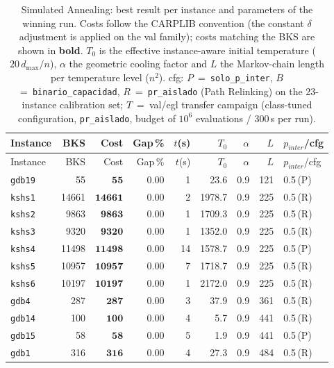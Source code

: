 \begingroup\scriptsize
\begin{longtable}{lrrrrrrrl}
\caption{Simulated Annealing: best result per instance and parameters of the winning run. Costs follow the CARPLIB convention (the constant $\delta$ adjustment is applied on the val family); costs matching the BKS are shown in \textbf{bold}. $T_0$ is the effective instance-aware initial temperature ($20\,d_{\max}/n$), $\alpha$ the geometric cooling factor and $L$ the Markov-chain length per temperature level ($n^2$). cfg: $P$~=~\texttt{solo\_p\_inter}, $B$~=~\texttt{binario\_capacidad}, $R$~=~\texttt{pr\_aislado} (Path Relinking) on the 23-instance calibration set; $T$~=~val/egl transfer campaign (class-tuned configuration, \texttt{pr\_aislado}, budget of $10^6$ evaluations / 300\,s per run).}\label{tab:sa-per-instance}\\
\toprule
Instance & BKS & Cost & Gap\,\% & $t$(s) & $T_0$ & $\alpha$ & $L$ & $p_{inter}$/cfg \\
\midrule
\endfirsthead
\toprule
Instance & BKS & Cost & Gap\,\% & $t$(s) & $T_0$ & $\alpha$ & $L$ & $p_{inter}$/cfg \\
\midrule
\endhead
\bottomrule
\endfoot
\texttt{gdb19} & 55 & $\mathbf{55}$ & 0.00 & 1 & 23.6 & 0.9 & 121 & 0.5\,(P) \\
\texttt{kshs1} & 14661 & $\mathbf{14661}$ & 0.00 & 2 & 1978.7 & 0.9 & 225 & 0.5\,(R) \\
\texttt{kshs2} & 9863 & $\mathbf{9863}$ & 0.00 & 1 & 1709.3 & 0.9 & 225 & 0.5\,(R) \\
\texttt{kshs3} & 9320 & $\mathbf{9320}$ & 0.00 & 1 & 1352.0 & 0.9 & 225 & 0.5\,(R) \\
\texttt{kshs4} & 11498 & $\mathbf{11498}$ & 0.00 & 14 & 1578.7 & 0.9 & 225 & 0.5\,(P) \\
\texttt{kshs5} & 10957 & $\mathbf{10957}$ & 0.00 & 7 & 1718.7 & 0.9 & 225 & 0.5\,(R) \\
\texttt{kshs6} & 10197 & $\mathbf{10197}$ & 0.00 & 1 & 2172.0 & 0.9 & 225 & 0.5\,(R) \\
\texttt{gdb4} & 287 & $\mathbf{287}$ & 0.00 & 3 & 37.9 & 0.9 & 361 & 0.5\,(R) \\
\texttt{gdb14} & 100 & $\mathbf{100}$ & 0.00 & 4 & 5.7 & 0.9 & 441 & 0.5\,(R) \\
\texttt{gdb15} & 58 & $\mathbf{58}$ & 0.00 & 5 & 1.9 & 0.9 & 441 & 0.5\,(P) \\
\texttt{gdb1} & 316 & $\mathbf{316}$ & 0.00 & 4 & 27.3 & 0.9 & 484 & 0.5\,(R) \\

\end{longtable}
